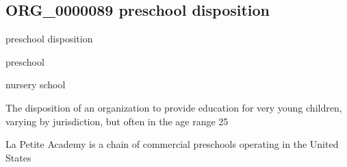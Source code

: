 \documentclass[letterpaper,10pt,english]{sphinxmanual}
\begin{document}
\subsection{ORG\_0000089 \sphinxhyphen{} pre\sphinxhyphen{}school disposition}
\label{\detokenize{doc-ORG_0000089:org-0000089-pre-school-disposition}}\label{\detokenize{doc-ORG_0000089:index-0}}\label{\detokenize{doc-ORG_0000089::doc}}
\begin{sphinxShadowBox}

\sphinxAtStartPar
pre\sphinxhyphen{}school disposition
\end{sphinxShadowBox}

\begin{sphinxShadowBox}

\sphinxAtStartPar
preschool
\end{sphinxShadowBox}

\begin{sphinxShadowBox}

\sphinxAtStartPar
nursery school
\end{sphinxShadowBox}

\begin{sphinxShadowBox}

\sphinxAtStartPar
{\hyperref[\detokenize{doc-BFO_0000016::doc}]{}}
\end{sphinxShadowBox}

\begin{sphinxShadowBox}

\sphinxAtStartPar
The disposition of an organization to provide education for very young children, varying by jurisdiction, but often in the age range 2\sphinxhyphen{}5
\end{sphinxShadowBox}

\begin{sphinxShadowBox}

\sphinxAtStartPar
{}
\end{sphinxShadowBox}

\begin{sphinxShadowBox}

\sphinxAtStartPar
La Petite Academy is a chain of commercial preschools operating in the United States
\end{sphinxShadowBox}
\end{document}
